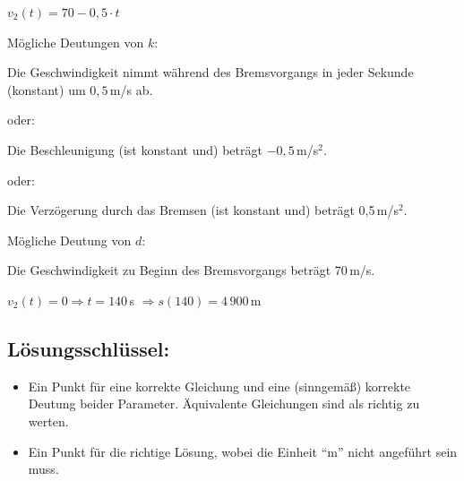 \begin{langesbeispiel}
{\begin{enumerate}
	$v_2(t)=70-0,5\cdot t$\leer
	
	Mögliche Deutungen von $k$:
	
	Die Geschwindigkeit nimmt während des Bremsvorgangs in jeder Sekunde (konstant) um $0,5$\,m/s ab.\leer
	
	oder:
	
	Die Beschleunigung (ist konstant und) beträgt $-0,5$\,m/s$^2$.\leer
	
	oder:
	
	Die Verzögerung durch das Bremsen (ist konstant und) beträgt 0,5\,m/s$^2$.\leer
	
	Mögliche Deutung von $d$:
	
	Die Geschwindigkeit zu Beginn des Bremsvorgangs beträgt 70\,m/s.
	
	$v_2(t)=0 \Rightarrow t=140$\,s $\Rightarrow s(140)=4\,900$\,m

	\subsection{Lösungsschlüssel:}
	
\begin{itemize}
	\item Ein Punkt für eine korrekte Gleichung und eine (sinngemäß) korrekte Deutung beider Parameter. Äquivalente Gleichungen sind als richtig zu werten. 
	\item Ein Punkt für die richtige Lösung, wobei die Einheit "`m"' nicht angeführt sein muss.
\end{itemize}

\end{enumerate}}
		\end{langesbeispiel}